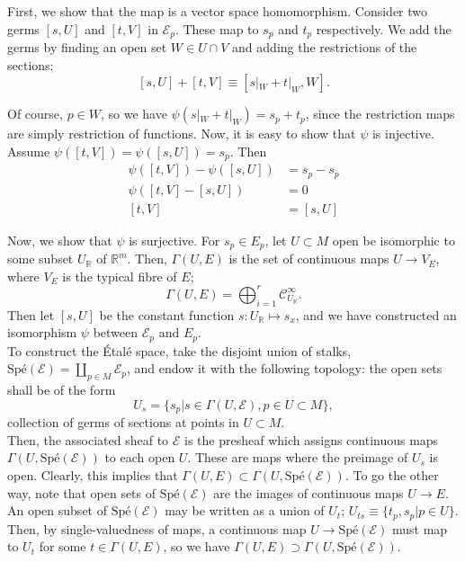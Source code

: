 \documentclass[12pt]{article}
\newcommand{\spe}[1]{\ensuremath{ \text{Sp\'e}(#1)}}
\newcommand{\RR}[0]{\ensuremath{\mathbb R}}
\begin{document}
First, we show that the map is a vector space homomorphism.  Consider two
germs $[s,U]$ and $[t,V]$ in $\mathcal E_p$.  These map to $s_p$ and $t_p$
respectively.  We add the germs by finding an open set $W\in U\cap V$ and
adding the restrictions of the sections;
\[[s,U] + [t,V] \equiv [s|_W + t|_W, W].\]

Of course, $p\in W$, so we have $\psi(s|_W + t|_W) = s_p + t_p$, since the
restriction maps are simply restriction of functions.
Now, it is easy to show that $\psi$ is injective.  
Assume $\psi([t,V]) = \psi([s,U]) = s_p$.  Then 
\begin{align*}
\psi([t,V]) - \psi([s,U]) &= s_p - s_p \\
\psi([t,V] - [s,U]) &= 0\\
[t,V] &= [s,U]
\end{align*}

Now, we show that $\psi$ is surjective.  For $s_p\in E_p$, let $U\subset M$
open be isomorphic to some subset $U_\RR$ of $\RR^m$.  Then, $\Gamma(U,E)$ is the
set of continuous maps $U\rightarrow V_E$, where $V_E$ is the typical fibre of $E$;
\[\Gamma(U,E) = \bigoplus_{i=1}^r \mathcal C_{U_\RR}^\infty.\]
Then let $[s,U]$ be the constant function $s:U_\RR\mapsto s_x$, and we
have constructed an isomorphism $\psi$ between $\mathcal E_p$ and $E_p$.\\

To construct the \'Etal\'e space, take the disjoint union of stalks,
\(\text{Sp\'e}(\mathcal E) = \coprod_{p\in M} \mathcal E_p\), and endow it with
the following topology:  the open sets shall be  of the form
\[ U_s = \bigl\{s_p | s\in \Gamma(U,\mathcal E), p\in U\subset M\bigr\},\]
collection of germs of sections at points in $U\subset M$.\\

Then, the associated sheaf to $\mathcal E$ is the presheaf which assigns
continuous maps $\Gamma(U,\spe {\mathcal E})$ to each open $U$.  These are
maps where the preimage of $U_s$ is open. Clearly, this implies that
$\Gamma(U,E) \subset \Gamma(U,\spe{\mathcal E})$.  To go the other way, note
that open sets of $\spe{\mathcal E}$ are the images of continuous maps $U\rightarrow
E$.  An open subset of $\spe{\mathcal E}$ may be written as a union of $U_t$;
$U_{ts} \equiv \{t_p, s_p | p\in U\}$.  Then, by single-valuedness of maps,
a continuous map $U\rightarrow \spe{\mathcal E}$ must map to $U_t$ for some $t\in
\Gamma(U,E)$, so we have $\Gamma(U,E) \supset \Gamma(U,\spe{\mathcal E})$.
\end{document}
